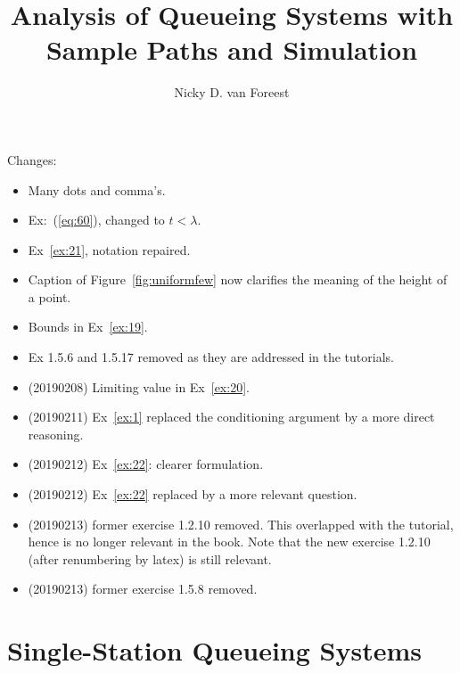\author{Nicky D. van  Foreest}
\title{Analysis of Queueing Systems with  Sample Paths and Simulation }


\maketitle

Changes:
\begin{itemize}
\item Many dots and comma's. 
\item Ex:~(\ref{eq:60}), changed to $t<\lambda$. 
\item Ex~\ref{ex:21}, notation repaired.
\item Caption of Figure~\ref{fig:uniformfew} now clarifies the meaning of the height of a point. 
\item Bounds in Ex~\ref{ex:19}.
\item Ex 1.5.6 and 1.5.17 removed as they are  addressed in the tutorials. 
\item (20190208) Limiting value in Ex~\ref{ex:20}. 
\item (20190211) Ex~\ref{ex:1} replaced the conditioning argument by a more direct reasoning.
\item (20190212) Ex~\ref{ex:22}: clearer formulation.
\item (20190212) Ex~\ref{ex:22} replaced by a more relevant question.
\item (20190213) former exercise 1.2.10 removed. This overlapped with the tutorial, hence is no longer relevant in the book. Note that the new exercise 1.2.10 (after renumbering by latex) is still relevant. 
\item (20190213) former exercise 1.5.8 removed.
\end{itemize}

\tableofcontents




\chapter{Single-Station Queueing Systems}
\label{cha:single-stat-queu}



















%
 



%


